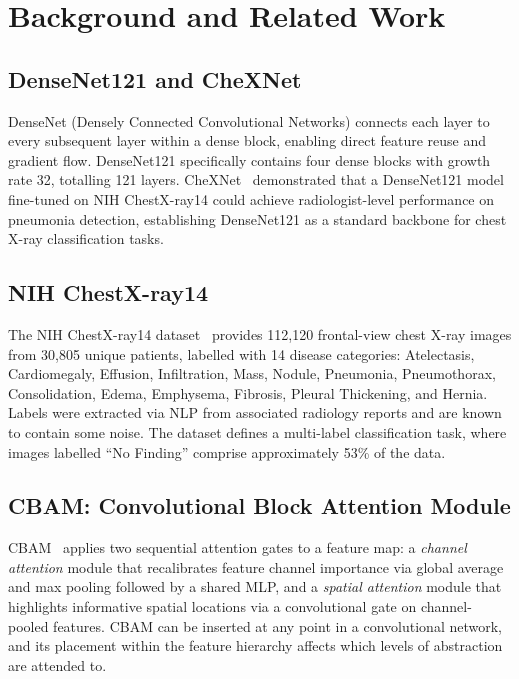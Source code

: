 \section{Background and Related Work}

\subsection{DenseNet121 and CheXNet}

DenseNet (Densely Connected Convolutional Networks) connects each layer to every subsequent layer within a dense block, enabling direct feature reuse and gradient flow.
DenseNet121 specifically contains four dense blocks with growth rate 32, totalling 121 layers.
CheXNet~\cite{rajpurkar2017chexnet} demonstrated that a DenseNet121 model fine-tuned on NIH ChestX-ray14 could achieve radiologist-level performance on pneumonia detection, establishing DenseNet121 as a standard backbone for chest X-ray classification tasks.

\subsection{NIH ChestX-ray14}

The NIH ChestX-ray14 dataset~\cite{wang2017chestxray14} provides 112,120 frontal-view chest X-ray images from 30,805 unique patients, labelled with 14 disease categories: Atelectasis, Cardiomegaly, Effusion, Infiltration, Mass, Nodule, Pneumonia, Pneumothorax, Consolidation, Edema, Emphysema, Fibrosis, Pleural Thickening, and Hernia.
Labels were extracted via NLP from associated radiology reports and are known to contain some noise.
The dataset defines a multi-label classification task, where images labelled ``No Finding'' comprise approximately 53\% of the data.

\subsection{CBAM: Convolutional Block Attention Module}

CBAM~\cite{woo2018cbam} applies two sequential attention gates to a feature map: a \emph{channel attention} module that recalibrates feature channel importance via global average and max pooling followed by a shared MLP, and a \emph{spatial attention} module that highlights informative spatial locations via a convolutional gate on channel-pooled features.
CBAM can be inserted at any point in a convolutional network, and its placement within the feature hierarchy affects which levels of abstraction are attended to.

